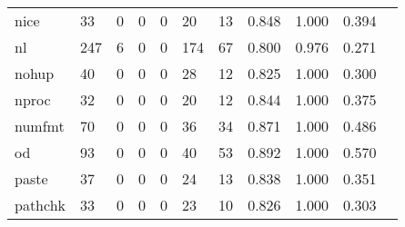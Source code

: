 \begin{longtable}{lp{1.10cm}p{1.10cm}p{1.10cm}p{1.10cm}p{1.10cm}p{1.10cm}p{1.10cm}p{1.10cm}p{1.10cm}p{1.10cm}}
nice      &                     33 &                                  0 &                                 0 &                                0 &                                20 &                              13 &                          0.848 &                                 1.000 &                               0.394 \\
nl        &                    247 &                                  6 &                                 0 &                                0 &                               174 &                              67 &                          0.800 &                                 0.976 &                               0.271 \\
nohup     &                     40 &                                  0 &                                 0 &                                0 &                                28 &                              12 &                          0.825 &                                 1.000 &                               0.300 \\
nproc     &                     32 &                                  0 &                                 0 &                                0 &                                20 &                              12 &                          0.844 &                                 1.000 &                               0.375 \\
numfmt    &                     70 &                                  0 &                                 0 &                                0 &                                36 &                              34 &                          0.871 &                                 1.000 &                               0.486 \\
od        &                     93 &                                  0 &                                 0 &                                0 &                                40 &                              53 &                          0.892 &                                 1.000 &                               0.570 \\
paste     &                     37 &                                  0 &                                 0 &                                0 &                                24 &                              13 &                          0.838 &                                 1.000 &                               0.351 \\
pathchk   &                     33 &                                  0 &                                 0 &                                0 &                                23 &                              10 &                          0.826 &                                 1.000 &                               0.303 \\

\end{longtable}
